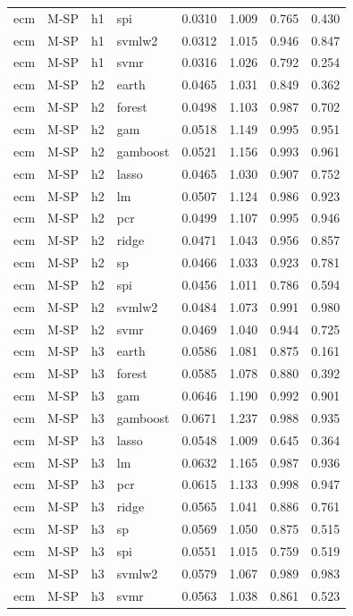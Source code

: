 \begin{ThreePartTable}
\begin{longtable}[t]{llclcccc}
ecm & M-SP & h1 & spi & 0.0310 & 1.009 & 0.765 & 0.430\\
ecm & M-SP & h1 & svmlw2 & 0.0312 & 1.015 & 0.946 & 0.847\\
ecm & M-SP & h1 & svmr & 0.0316 & 1.026 & 0.792 & 0.254\\
\addlinespace
ecm & M-SP & h2 & earth & 0.0465 & 1.031 & 0.849 & 0.362\\
ecm & M-SP & h2 & forest & 0.0498 & 1.103 & 0.987 & 0.702\\
ecm & M-SP & h2 & gam & 0.0518 & 1.149 & 0.995 & 0.951\\
ecm & M-SP & h2 & gamboost & 0.0521 & 1.156 & 0.993 & 0.961\\
ecm & M-SP & h2 & lasso & 0.0465 & 1.030 & 0.907 & 0.752\\
ecm & M-SP & h2 & lm & 0.0507 & 1.124 & 0.986 & 0.923\\
ecm & M-SP & h2 & pcr & 0.0499 & 1.107 & 0.995 & 0.946\\
ecm & M-SP & h2 & ridge & 0.0471 & 1.043 & 0.956 & 0.857\\
ecm & M-SP & h2 & sp & 0.0466 & 1.033 & 0.923 & 0.781\\
ecm & M-SP & h2 & spi & 0.0456 & 1.011 & 0.786 & 0.594\\
ecm & M-SP & h2 & svmlw2 & 0.0484 & 1.073 & 0.991 & 0.980\\
ecm & M-SP & h2 & svmr & 0.0469 & 1.040 & 0.944 & 0.725\\
\addlinespace
ecm & M-SP & h3 & earth & 0.0586 & 1.081 & 0.875 & 0.161\\
ecm & M-SP & h3 & forest & 0.0585 & 1.078 & 0.880 & 0.392\\
ecm & M-SP & h3 & gam & 0.0646 & 1.190 & 0.992 & 0.901\\
ecm & M-SP & h3 & gamboost & 0.0671 & 1.237 & 0.988 & 0.935\\
ecm & M-SP & h3 & lasso & 0.0548 & 1.009 & 0.645 & 0.364\\
ecm & M-SP & h3 & lm & 0.0632 & 1.165 & 0.987 & 0.936\\
ecm & M-SP & h3 & pcr & 0.0615 & 1.133 & 0.998 & 0.947\\
ecm & M-SP & h3 & ridge & 0.0565 & 1.041 & 0.886 & 0.761\\
ecm & M-SP & h3 & sp & 0.0569 & 1.050 & 0.875 & 0.515\\
ecm & M-SP & h3 & spi & 0.0551 & 1.015 & 0.759 & 0.519\\
ecm & M-SP & h3 & svmlw2 & 0.0579 & 1.067 & 0.989 & 0.983\\
ecm & M-SP & h3 & svmr & 0.0563 & 1.038 & 0.861 & 0.523\\

\end{longtable}
\end{ThreePartTable}
